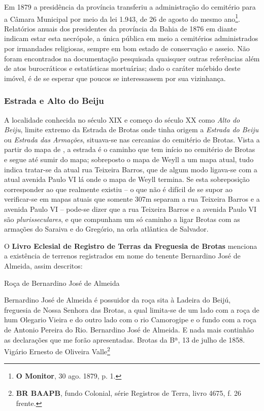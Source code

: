 Em 1879 a presidência da província transferiu a administração do cemitério para a Câmara Municipal por meio da lei 1.943, de 26 de agosto do mesmo ano\footnote{\textbf{O Monitor}, 30 ago. 1879, p. 1.}. Relatórios anuais dos presidentes da província da Bahia de 1876 em diante indicam estar esta necrópole, a única pública em meio a cemitérios administrados por irmandades religiosas, sempre em bom estado de conservação e asseio. Não foram encontrados na documentação pesquisada quaisquer outras referências além de atos burocráticos e estatísticas mortuárias; dado o caráter mórbido deste imóvel, é de se esperar que poucos se interessassem por sua vizinhança.

\subsubsection{Estrada e Alto do Beiju}\label{subsubsec:estrbeiju}

A localidade conhecida no século XIX e começo do século XX como \textit{Alto do Beiju}, limite extremo da Estrada de Brotas onde tinha origem a \textit{Estrada do Beiju} ou \textit{Estrada das Armações}, situava-se nas cercanias do cemitério de Brotas. Vista a partir do mapa de , a estrada é o caminho que tem início no cemitério de Brotas e segue até sumir do mapa; sobreposto o mapa de Weyll a um mapa atual, tudo indica tratar-se da atual rua Teixeira Barros, que de algum modo ligava-se com a atual avenida Paulo VI lá onde o mapa de Weyll termina. Se esta sobreposição corresponder ao que realmente existiu -- o que não é difícil de se supor ao verificar-se em mapas atuais que somente 307m separam a rua Teixeira Barros e a avenida Paulo VI -- pode-se dizer que a rua Teixeira Barros e a avenida Paulo VI são \textit{plurisseculares}, e que compunham um só caminho a ligar Brotas com as armações do Saraiva e do Gregório, na orla atlântica de Salvador.

O \textbf{Livro Eclesial de Registro de Terras da Freguesia de Brotas} menciona a existência de terrenos registrados em nome do tenente Bernardino José de Almeida, assim descritos:

\begin{citacao}
Roça de Bernardino José de Almeida

Bernardino José de Almeida é possuidor da roça sita à Ladeira do Beijú, freguesia de Nossa Senhora das Brotas, a qual limita-se de um lado com a roça de hum Olegario Vieira e do outro lado com o rio Camorogipe e o fundo com a roça de Antonio Pereira do Rio. Bernardino José de Almeida. E nada mais continhão as declarações que me forão apresentadas. Brotas da Bª, 13 de julho de 1858. Vigário Ernesto de Oliveira Valle\footnote{\textbf{BR BAAPB}, fundo Colonial, série Registros de Terra, livro 4675, f. 26 frente.}
\end{citacao}

